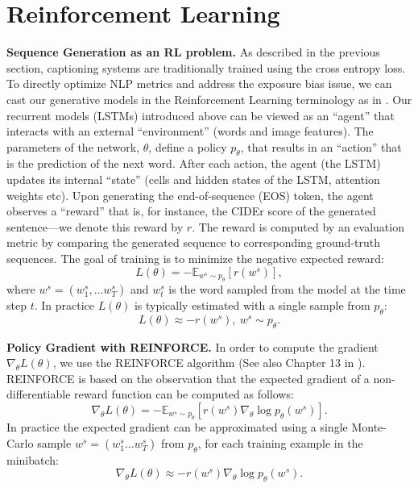 \documentclass[10pt,twocolumn,letterpaper]{article}
\begin{document}
\section{Reinforcement Learning}
\noindent \textbf{Sequence Generation as an RL problem.} As described in the previous section, captioning systems are traditionally trained using the cross entropy loss. To directly optimize NLP metrics and address the exposure bias issue, we can cast our generative models in the Reinforcement Learning terminology as in \cite{Ranzato}. Our recurrent models (LSTMs) introduced above can be viewed as an ``agent'' that interacts with an external ``environment'' (words and image features). The parameters of the network, $\theta$, define a policy $p_{\theta}$, that results in an ``action'' that is the prediction of the next word.  After each action, the agent (the LSTM) updates its internal ``state'' (cells and hidden states of the LSTM, attention weights etc). Upon generating the end-of-sequence (EOS) token, the agent observes a ``reward'' that is, for instance, the CIDEr score of the generated sentence---we denote this reward by $r$. The reward is computed by an evaluation metric by comparing the generated sequence to corresponding ground-truth sequences. The goal of training is to minimize the negative expected reward:
\begin{equation}
L(\theta)= -  \mathbb{E}_{w^s\sim p_{\theta}} \left[ r(w^s)\right],
\end{equation}     
where $w^s= (w^s_1,\dots w^s_T)$ and  $w^s_{t}$ is the word sampled from the model at the time step $t$.
In practice $L(\theta)$ is typically estimated with a single sample from $p_{\theta}$:
\begin{equation*}
L(\theta) \approx-r(w^s),~ w^s \sim p_{\theta}.
\end{equation*}

\noindent \textbf{Policy Gradient with REINFORCE.} In order to compute the gradient $\nabla_{\theta}L(\theta)$, we use the REINFORCE algorithm \cite{Reinforce}(See also Chapter 13 in \cite{Sutton:1998}). REINFORCE is based on the observation that the expected gradient of a non-differentiable reward function can be computed as follows:
\begin{equation}
\nabla_{\theta}L(\theta)= - \mathbb{E}_{w^s \sim p_{\theta}} \left[ r(w^s) \nabla_{\theta} \log p_{\theta}(w^s) \right].
\end{equation}
In practice the expected gradient can be approximated using a single Monte-Carlo sample $w^s=(w^s_1 \dots w^s_{T})$ from $p_{\theta}$, for each training example in the minibatch:
\begin{equation*}
\nabla_{\theta}L(\theta)\approx- r(w^s) \nabla_{\theta} \log p_{\theta}(w^s).
\end{equation*}
\end{document}
